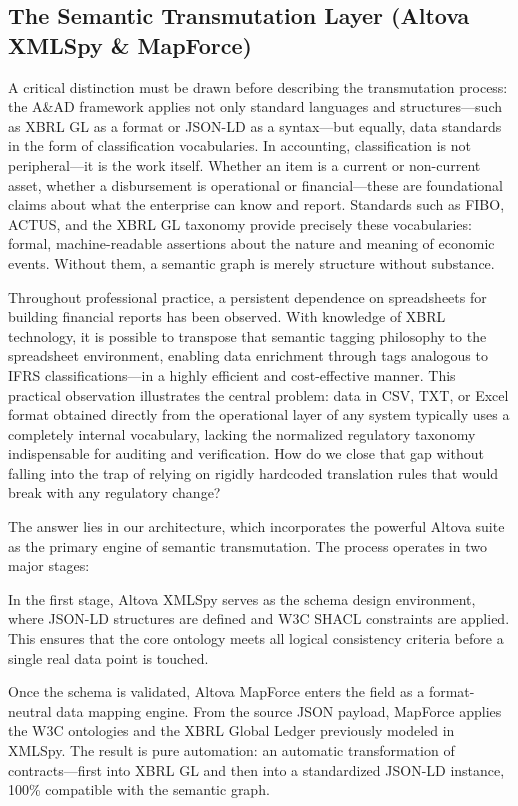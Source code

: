 \documentclass[12pt, a4paper]{article}
\begin{document}
\subsection{The Semantic Transmutation Layer (Altova XMLSpy \& MapForce)}

A critical distinction must be drawn before describing the transmutation process: the A\&AD framework applies not only standard languages and structures---such as XBRL GL as a format or JSON-LD as a syntax---but equally, data standards in the form of classification vocabularies. In accounting, classification is not peripheral---it is the work itself. Whether an item is a current or non-current asset, whether a disbursement is operational or financial---these are foundational claims about what the enterprise can know and report. Standards such as FIBO, ACTUS, and the XBRL GL taxonomy provide precisely these vocabularies: formal, machine-readable assertions about the nature and meaning of economic events. Without them, a semantic graph is merely structure without substance.

Throughout professional practice, a persistent dependence on spreadsheets for building financial reports has been observed. With knowledge of XBRL technology, it is possible to transpose that semantic tagging philosophy to the spreadsheet environment, enabling data enrichment through tags analogous to IFRS classifications---in a highly efficient and cost-effective manner. This practical observation illustrates the central problem: data in CSV, TXT, or Excel format obtained directly from the operational layer of any system typically uses a completely internal vocabulary, lacking the normalized regulatory taxonomy indispensable for auditing and verification. How do we close that gap without falling into the trap of relying on rigidly hardcoded translation rules that would break with any regulatory change?

The answer lies in our architecture, which incorporates the powerful Altova suite as the primary engine of semantic transmutation. The process operates in two major stages:

In the first stage, Altova XMLSpy serves as the schema design environment, where JSON-LD structures are defined and W3C SHACL constraints are applied. This ensures that the core ontology meets all logical consistency criteria before a single real data point is touched.

Once the schema is validated, Altova MapForce enters the field as a format-neutral data mapping engine. From the source JSON payload, MapForce applies the W3C ontologies and the XBRL Global Ledger previously modeled in XMLSpy. The result is pure automation: an automatic transformation of contracts---first into XBRL GL and then into a standardized JSON-LD instance, 100\% compatible with the semantic graph.
\end{document}
